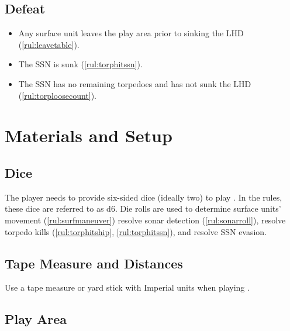 \documentclass[../TacSubMicroRules.tex]{subfiles}
\begin{document}
\subsection{Defeat}%
\label{sub:defeat}

\begin{itemize}
    \item Any surface unit leaves the play area prior to sinking the LHD (\ref{rul:leavetable}).
    \item The SSN is sunk (\ref{rul:torphitssn}).
    \item The SSN has no remaining torpedoes and has not sunk the LHD (\ref{rul:torploosecount}).
\end{itemize}

\section{Materials and Setup}%
\label{sec:materialssetup}


\subsection{Dice}%
\label{sub:external_materials}

The player needs to provide six-sided dice (ideally two) to play \gametitle.
In the rules, these dice are referred to as d6.
Die rolls are used to determine surface units' movement (\ref{rul:surfmaneuver}) resolve sonar detection (\ref{rul:sonarroll}), resolve torpedo kills (\ref{rul:torphitship}, \ref{rul:torphitssn}), and resolve SSN evasion.

\subsection{Tape Measure and Distances}%
\label{sub:tape_measure}

Use a tape measure or yard stick with Imperial units when playing \gametitle.

\subsection{Play Area}%
\label{sub:playarea}
\end{document}
